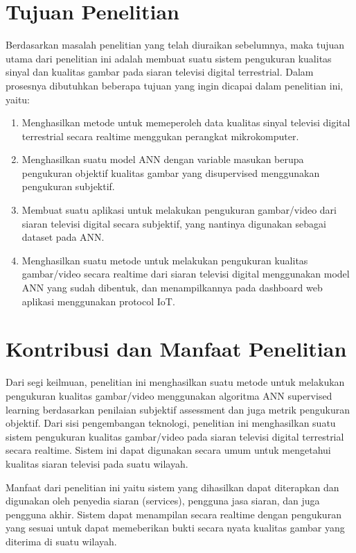 \section{Tujuan Penelitian}
\label{sec:4-TujuanPenelitian}
\hspace{1,2cm}Berdasarkan masalah penelitian yang telah diuraikan sebelumnya, maka tujuan utama dari penelitian ini adalah membuat suatu sistem pengukuran kualitas sinyal dan kualitas gambar pada siaran televisi digital terrestrial. Dalam prosesnya dibutuhkan beberapa tujuan yang ingin dicapai dalam penelitian ini, yaitu:
\begin{enumerate}
	\item Menghasilkan metode untuk memeperoleh data kualitas sinyal televisi digital terrestrial secara realtime menggukan perangkat mikrokomputer.
	\item Menghasilkan suatu model ANN dengan variable masukan berupa pengukuran objektif kualitas gambar yang disupervised menggunakan pengukuran subjektif.
	\item Membuat suatu aplikasi untuk melakukan pengukuran gambar/video dari siaran televisi digital secara subjektif, yang nantinya digunakan sebagai dataset pada ANN. 
	\item Menghasilkan suatu metode untuk melakukan pengukuran kualitas gambar/video secara realtime dari siaran televisi digital menggunakan model ANN yang sudah dibentuk, dan menampilkannya pada dashboard web aplikasi menggunakan protocol IoT. 
\end{enumerate}

\section{Kontribusi dan Manfaat Penelitian}
\label{sec:5-KontribusidanManfaatPenelitian}
\hspace{1,2cm}Dari segi keilmuan, penelitian ini menghasilkan suatu metode untuk melakukan pengukuran kualitas gambar/video menggunakan algoritma ANN supervised learning berdasarkan penilaian subjektif assessment dan juga metrik pengukuran objektif. Dari sisi pengembangan teknologi, penelitian ini menghasilkan suatu sistem pengukuran kualitas gambar/video pada siaran televisi digital terrestrial secara realtime. Sistem ini dapat digunakan secara umum untuk mengetahui kualitas siaran televisi pada suatu wilayah.

Manfaat dari penelitian ini yaitu sistem yang dihasilkan dapat diterapkan dan digunakan oleh penyedia siaran (services), pengguna jasa siaran, dan juga pengguna akhir. Sistem dapat menampilan secara realtime dengan pengukuran yang sesuai untuk dapat memeberikan bukti secara nyata kualitas gambar yang diterima di suatu wilayah.

